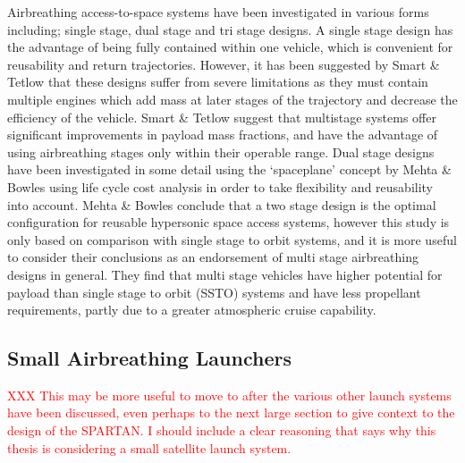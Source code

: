 Airbreathing access-to-space systems have been investigated in various forms including; single stage\cite{Powell1991,Varvill2008,Trefny1999,Roche2000,Young2006,Bradford2000}, dual stage\cite{Tsuchiya2005,Mehta2001,Gong2014,Wilhite1991} and tri stage\cite{Preller2017b} designs. 
  A single stage design has the advantage of being fully contained within one vehicle, which is convenient for reusability and return trajectories. However, it has been suggested by Smart \& Tetlow\cite{Smart2009} that these designs suffer from severe limitations as they must contain multiple engines which add mass at later stages of the trajectory and decrease the efficiency of the vehicle. Smart \& Tetlow suggest that multistage systems offer significant improvements in payload mass fractions, and have the advantage of using airbreathing stages only within their operable range.
  Dual stage designs have been investigated in some detail using the `spaceplane' concept by Mehta \& Bowles\cite{Mehta2001} using life cycle cost analysis in order to take flexibility and reusability into account. Mehta \& Bowles conclude that a two stage design is the optimal configuration for reusable hypersonic space access systems, however this study is only based on comparison with single stage to orbit systems, and it is more useful to consider their conclusions as an endorsement of multi stage airbreathing designs in general. They find that multi stage vehicles have higher potential for payload than single stage to orbit (SSTO) systems and have less propellant requirements, partly due to a greater atmospheric cruise capability. 
 
  

\subsection{Small Airbreathing Launchers}
\textcolor{red}{XXX This may be more useful to move to after the various other launch systems have been discussed, even perhaps to the next large section to give context to the design of the SPARTAN. I should include a clear reasoning that says why this thesis is considering a small satellite launch system.}


